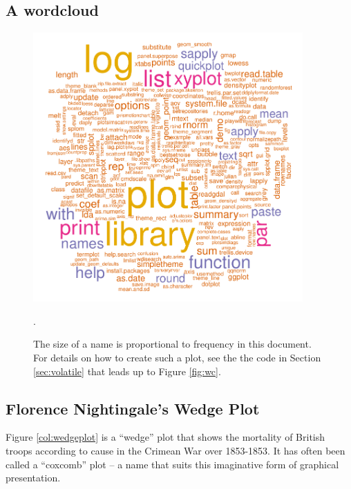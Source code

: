 \documentclass{tufte-book}\usepackage[]{graphicx}\usepackage[]{color}
\begin{document}
\subsection*{A wordcloud}
\begin{figure}
\vspace*{-0.75cm}
\includegraphics[width=0.92\textwidth]{colorArt/cloudfunR}
\caption{The size of a
  name is proportional to frequency in this document.  For details
  on how to create such a plot, see the the code in Section
  \ref{sec:volatile} that leads up to Figure \ref{fig:wc}.
  \label{fig:cloudfun}}.
\end{figure}

\newpage
\subsection*{Florence Nightingale's Wedge Plot}\label{sec:wedge}


Figure \ref{col:wedgeplot} is a ``wedge'' plot that shows the
mortality of British troops according to cause in the Crimean War over
1853-1853. It has often been called a ``coxcomb'' plot -- a name that
suits this imaginative form of graphical presentation.
\end{document}
